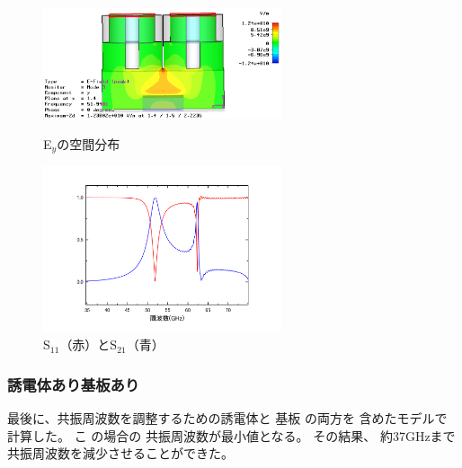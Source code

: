 \begin{figure}[h]
 \begin{minipage}{0.5\hsize}
  \begin{center}
   \includegraphics[width=70mm]{./image/model73_kiban_e_y_y.png}
  \end{center}
  \caption{E$_y$の空間分布}
  \label{fig:one}
 \end{minipage}
 \begin{minipage}{0.5\hsize}
  \begin{center}
   \includegraphics[width=70mm]{./image/Graph5.jpg}
  \end{center}
  \caption{S$_{11}$（赤）とS$_{21}$（青）}
  \label{fig:two}
 \end{minipage}
\end{figure}

\subsubsection{誘電体あり基板あり}
最後に、共振周波数を調整するための誘電体と
基板
の両方を
含めたモデルで
計算した。
こ
の場合の
共振周波数が最小値となる。
その結果、
約37GHzまで共振周波数を減少させることができた。

